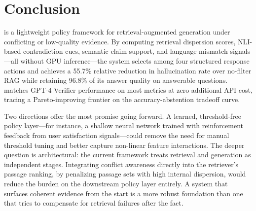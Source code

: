 \section{Conclusion}
\label{sec:conclusion}

\method{} is a lightweight policy framework for retrieval-augmented generation under conflicting or low-quality evidence. By computing retrieval dispersion scores, NLI-based contradiction cues, semantic claim support, and language mismatch signals---all without GPU inference---the system selects among four structured response actions and achieves a 55.7\% relative reduction in hallucination rate over no-filter RAG while retaining 96.8\% of its answer quality on answerable questions. \method{} matches GPT-4 Verifier performance on most metrics at zero additional API cost, tracing a Pareto-improving frontier on the accuracy-abstention tradeoff curve.

Two directions offer the most promise going forward. A learned, threshold-free policy layer---for instance, a shallow neural network trained with reinforcement feedback from user satisfaction signals---could remove the need for manual threshold tuning and better capture non-linear feature interactions. The deeper question is architectural: the current framework treats retrieval and generation as independent stages. Integrating conflict awareness directly into the retriever's passage ranking, by penalizing passage sets with high internal dispersion, would reduce the burden on the downstream policy layer entirely. A system that surfaces coherent evidence from the start is a more robust foundation than one that tries to compensate for retrieval failures after the fact.
